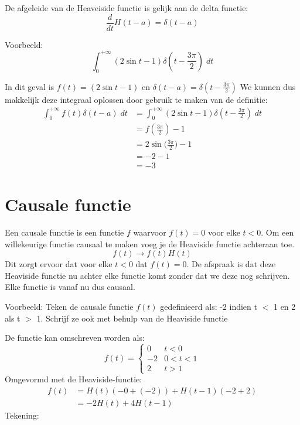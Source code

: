 \documentclass[12pt]{report}
\newcommand{\todo}[1]{
  {\color{red}\textunderscore{\textit{TODO: #1}}}
}
\newcommand{\example}[2]{
      \hrulefill
      
      Voorbeeld: #1
      
      #2
      
      \hrulefill
}
\begin{document}
De afgeleide van de Heaveiside functie is gelijk aan de delta functie:
$$\frac{d}{dt}H(t-a) = \delta(t - a)$$
\example{$$\int_{0}^{+\infty} (2\sin t - 1) \delta(t - \frac{3\pi}{2}) \; dt$$}{
In dit geval is $f(t) = (2\sin t - 1)$ en $\delta(t - a) = \delta(t - \frac{3\pi}{2})$
We kunnen dus makkelijk deze integraal oplossen door gebruik te maken van de definitie:
\begin{equation*}
 \begin{split}
  \int_{0}^{+\infty} f(t) \delta(t- a)\;dt & = \int_{0}^{+\infty} (2\sin t - 1) \delta(t - \frac{3\pi}{2}) \; dt \\
                                           & = f(\frac{3\pi}{2}) - 1  \\
                                           & = 2\sin \bigg(\frac{3\pi}{2}\bigg) - 1 \\
                                           & = -2 - 1 \\
                                           & = - 3
 \end{split}
\end{equation*}
}
\section{Causale functie}
Een causale functie is een functie $f$ waarvoor $f(t) = 0$ voor elke $t < 0$.
Om een willekeurige functie causaal te maken voeg je de Heaviside functie achteraan toe.
$$f(t) \rightarrow f(t)H(t)$$
Dit zorgt ervoor dat voor elke $t < 0$ dat $f(t) = 0$. De afspraak is dat deze Heaviside functie nu achter elke functie komt zonder dat we deze nog schrijven. Elke functie is vanaf nu dus causaal.

\example{Teken de causale functie $f(t)$ gedefinieerd als: -2 indien t $<$ 1 en 2 als t $>$ 1. Schrijf ze ook met behulp van de Heaviside functie}{
De functie kan omschreven worden als:
$$f(t) = \begin{cases}
          0 & t < 0 \\
          -2 & 0 < t < 1 \\
          2 & t > 1
         \end{cases}
$$
Omgevormd met de Heaviside-functie:
\begin{equation*}
 \begin{split}
  f(t) & = H(t)(-0 + (-2)) + H(t -  1)(-2 +2) \\
       & = -2H(t) + 4H(t - 1)
 \end{split}
\end{equation*}
Tekening:
\todo{graph}
}
\end{document}
